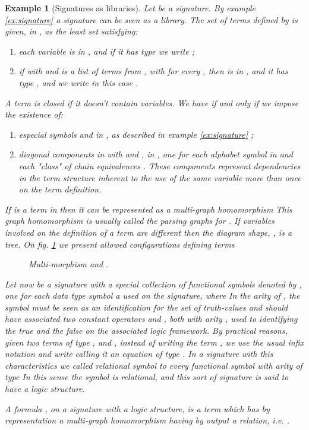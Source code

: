\documentclass[oribibl]{llncs}
\newtheorem{exam}{Example}
\begin{document}
\begin{exam}[Signatures as libraries]
Let   be a signature. By example \ref{ex:signature} a
signature can be seen as a library. The set  of terms
defined by  is given, in \cite{Makki89}, as the least set satisfying:
\begin{enumerate}
  \item each variable  is in , and if it
has type  we write ;
  \item if    with  and 
is a list of terms from , with  for every , then  is in , and it has type , and we
write in this case .
\end{enumerate}

A term is closed if it doesn't contain variables.  We have
 if and only if we impose the
existence of:
\begin{enumerate}
  \item especial symbols  and  in , as described in example \ref{ex:signature} ;
  \item diagonal components   in  with
  and  , in , one for each
alphabet symbol  in  and each "class" of chain
equivalences . These components represent dependencies in the term
structure inherent to the use of the same variable more than once
on the term definition.
\end{enumerate}

If  is a term in  then it can be represented as a
multi-graph homomorphism  This
graph homomorphism is usually called the parsing graphs for . If
variables involved on the definition of a term are different then
the diagram  shape, , is a tree. On fig. \ref{terms} we present allowed configurations
defining terms 
\begin{figure}[h]

\caption{Multi-morphism  and
.}\label{terms}
\end{figure}

Let now   be a signature with a special collection of
functional symbols denoted by , one for each data type symbol a
used on the signature, where  In the arity of
, the symbol  must be seen as an identification for the set
of truth-values and should have associated two constant operators
 and , both with arity , used to identifying the true
and the false on the associated logic framework. By practical
reasons, given two terms of type ,  and , instead of
writing the term , we use the usual infix notation and
write  calling it an equation of type . In a signature
with this characteristics we called relational symbol to every
functional symbol  with arity of type  In
this sense the symbol  is relational, and this sort of
signature  is said to have a logic structure.

A formula , on a signature  with a logic structure, is a
term which has by representation a multi-graph
homomorphism having by output a relation, i.e. .
\end{exam}
\end{document}
